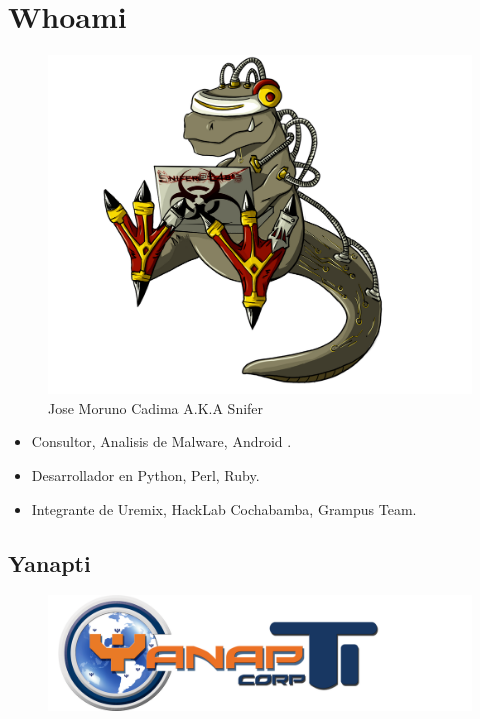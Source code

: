 \documentclass[12pt]{beamer} %
\date{Agosto 2013} %
\begin{document}
\section{Whoami}

\begin{slide}
  
    \begin{figure}[h]
      \begin{center}
        \includegraphics[height=0.5\textheight]{img/sniferl4bs.png}
Jose Moruno Cadima A.K.A Snifer\pause
      \end{center}
    \end{figure}
  \begin{itemize}
  \item Consultor, Analisis de Malware, Android .\pause
  \item Desarrollador en Python, Perl, Ruby.\pause
  \item Integrante de Uremix, HackLab Cochabamba, Grampus Team.\pause
  \end{itemize}
\end{slide}

\subsection{Yanapti}
\begin{slide}
    \begin{figure}[h]
      \begin{center}
        \includegraphics[height=0.5\textheight]{img/yanapti.png}
       \end{center}
    \end{figure}
  
\end{slide}
\end{document}
